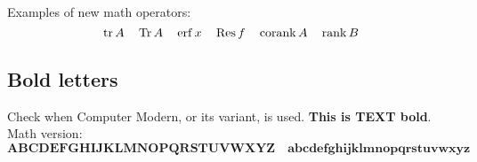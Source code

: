 \documentclass[11pt]{article}
\begin{document}
Examples of new math operators:
\begin{equation}
  \operatorname{tr}{A}\quad \operatorname{Tr}{A}\quad \operatorname{erf}{x}\quad \operatorname{Res}{f}\quad \operatorname{corank}{A}\quad \operatorname{rank}{B}
\end{equation}

\subsection{Bold letters}

Check when Computer Modern, or its variant, is used. \textbf{This is TEXT bold}.  Math version:
\begin{equation}
  \mathbf{ABCDEFGHIJKLMNOPQRSTUVWXYZ}\quad \mathbf{abcdefghijklmnopqrstuvwxyz}
\end{equation}
\end{document}
